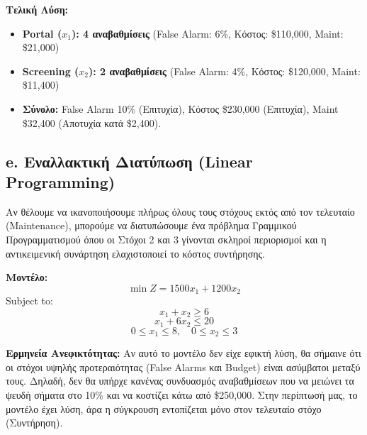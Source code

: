 \documentclass[12pt, a4paper]{article}
\begin{document}
\textbf{Τελική Λύση:}
\begin{itemize}
    \item \textbf{Portal ($x_1$): 4 αναβαθμίσεις} (False Alarm: 6\%, Κόστος: \$110,000, Maint: \$21,000)
    \item \textbf{Screening ($x_2$): 2 αναβαθμίσεις} (False Alarm: 4\%, Κόστος: \$120,000, Maint: \$11,400)
    \item \textbf{Σύνολο:} False Alarm 10\% (Επιτυχία), Κόστος \$230,000 (Επιτυχία), Maint \$32,400 (Αποτυχία κατά \$2,400).
\end{itemize}

\subsection*{e. Εναλλακτική Διατύπωση (Linear Programming)}
Αν θέλουμε να ικανοποιήσουμε πλήρως όλους τους στόχους εκτός από τον τελευταίο (Maintenance), μπορούμε να διατυπώσουμε ένα πρόβλημα Γραμμικού Προγραμματισμού όπου οι Στόχοι 2 και 3 γίνονται σκληροί περιορισμοί και η αντικειμενική συνάρτηση ελαχιστοποιεί το κόστος συντήρησης.

\textbf{Μοντέλο:}
$$ \min Z = 1500x_1 + 1200x_2 $$
Subject to:
$$ x_1 + x_2 \ge 6 $$
$$ x_1 + 6x_2 \le 20 $$
$$ 0 \le x_1 \le 8, \quad 0 \le x_2 \le 3 $$

\textbf{Ερμηνεία Ανεφικτότητας:}
Αν αυτό το μοντέλο δεν είχε εφικτή λύση, θα σήμαινε ότι οι στόχοι υψηλής προτεραιότητας (False Alarms και Budget) είναι ασύμβατοι μεταξύ τους. Δηλαδή, δεν θα υπήρχε κανένας συνδυασμός αναβαθμίσεων που να μειώνει τα ψευδή σήματα στο 10\% και να κοστίζει κάτω από \$250,000. Στην περίπτωσή μας, το μοντέλο έχει λύση, άρα η σύγκρουση εντοπίζεται μόνο στον τελευταίο στόχο (Συντήρηση).
\end{document}
